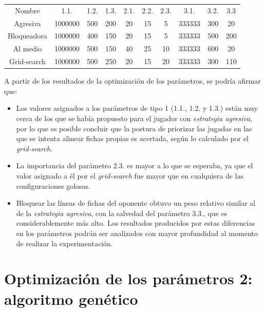 \documentclass[12pt,a4paper]{article}
\begin{document}
    \begin{center}
		\begin{tabular}{ | c || c | c | c | c | c | c | c | c | c | }
		\hline
		Nombre &  1.1. &  1.2. &  1.3. &  2.1. &  2.2. &  2.3. &  3.1. &  3.2. &  3.3 \\ \hhline{|=#=|=|=|=|=|=|=|=|=|}
		    Agresiva &  1000000 &  500 &  200 &  20 &  15 &  5 &  333333 &  300 &  20 \\ \hline
		    Bloqueadora &  1000000 &  400 &  150 &  20 &  15 &  5 &  333333 &  500 &  200 \\ \hline
		    Al medio &  1000000 &  500 &  150 &  40 &  25 &  10 &  333333 &  600 &  20 \\ \hline
		    Grid-search &  1000000 &  500 &  250 &  20 &  15 &  20 &  333333 &  300 &  110 \\ \hline
		\end{tabular}
    \end{center}
    
    A partir de los resultados de la optimización de los parámetros, se podría afirmar que:
        \begin{itemize}
            \item Los valores asignados a los parámetros de tipo 1 (1.1., 1.2. y 1.3.) están muy cerca de los que se había propuesto para el jugador con \textit{estrategia agresiva}, por lo que es posible concluir que la postura de priorizar las jugadas en las que se intenta alinear fichas propias es acertada, según lo calculado por el \textit{grid-search}.
            \item La importancia del parámetro 2.3. es mayor a lo que se esperaba, ya que el valor asignado a él por el \textit{grid-search }fue mayor que en cualquiera de las configuraciones golosas.
            \item Bloquear las líneas de fichas del oponente obtuvo un peso relativo similar al de la \textit{estrategia agresiva}, con la salvedad del parámetro 3.3., que es considerablemente más alto. Los resultados producidos por estas diferencias en los parámetros podrán ser analizados con mayor profundidad al momento de realizar la experimentación.
        \end{itemize}

\newpage

	

\section{Optimización de los parámetros 2: algoritmo genético}
\end{document}
